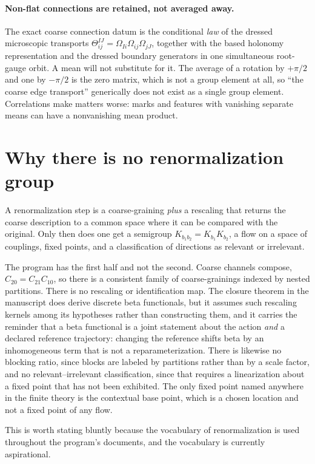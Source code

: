 \documentclass[11pt,letterpaper]{article}
\begin{document}
\paragraph{Non-flat connections are retained, not averaged away.} The exact coarse
connection datum is the conditional \emph{law} of the dressed microscopic transports
$\Theta^{IJ}_{ij} = \Omega_{Ii}\Omega_{ij}\Omega_{jJ}$, together with the based
holonomy representation and the dressed boundary generators in one simultaneous
root-gauge orbit. A mean will not substitute for it. The average of a rotation by
$+\pi/2$ and one by $-\pi/2$ is the zero matrix, which is not a group element at all,
so ``the coarse edge transport'' generically does not exist as a single group
element. Correlations make matters worse: marks and features with vanishing separate
means can have a nonvanishing mean product.

\section{Why there is no renormalization group}

A renormalization step is a coarse-graining \emph{plus} a rescaling that returns the
coarse description to a common space where it can be compared with the original.
Only then does one get a semigroup $K_{b_1 b_2} = K_{b_1} K_{b_2}$, a flow on a space
of couplings, fixed points, and a classification of directions as relevant or
irrelevant.

The program has the first half and not the second. Coarse channels compose,
$C_{20} = C_{21} C_{10}$, so there is a consistent family of coarse-grainings indexed
by nested partitions. There is no rescaling or identification map. The closure
theorem in the manuscript does derive discrete beta functionals, but it assumes such
rescaling kernels among its hypotheses rather than constructing them, and it carries
the reminder that a beta functional is a joint statement about the action \emph{and}
a declared reference trajectory: changing the reference shifts beta by an
inhomogeneous term that is not a reparameterization. There is likewise no blocking
ratio, since blocks are labeled by partitions rather than by a scale factor, and no
relevant--irrelevant classification, since that requires a linearization about a
fixed point that has not been exhibited. The only fixed point named anywhere in the
finite theory is the contextual base point, which is a chosen location and not a
fixed point of any flow.

This is worth stating bluntly because the vocabulary of renormalization is used
throughout the program's documents, and the vocabulary is currently aspirational.
\end{document}
